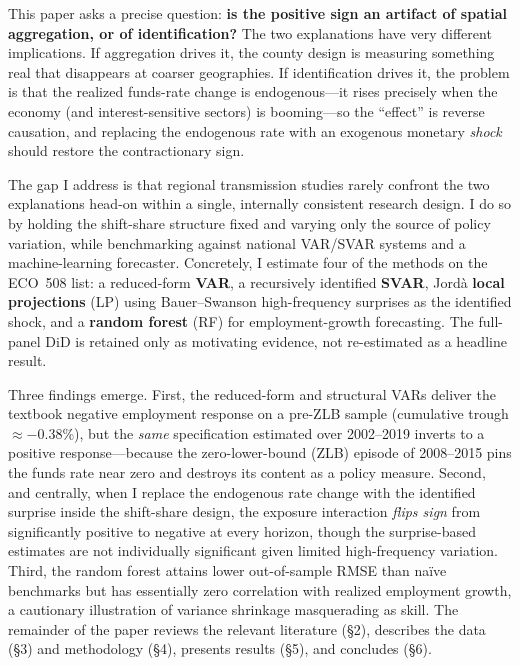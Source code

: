 \documentclass[11pt]{article}
\begin{document}
This paper asks a precise question: \textbf{is the positive sign an artifact of spatial
aggregation, or of identification?} The two explanations have very different implications.
If aggregation drives it, the county design is measuring something real that disappears at
coarser geographies. If identification drives it, the problem is that the realized funds-rate
change is endogenous---it rises precisely when the economy (and interest-sensitive sectors)
is booming---so the ``effect'' is reverse causation, and replacing the endogenous rate with an
exogenous monetary \emph{shock} should restore the contractionary sign.

The gap I address is that regional transmission studies rarely confront the two explanations
head-on within a single, internally consistent research design. I do so by holding the
shift-share structure fixed and varying only the source of policy variation, while
benchmarking against national VAR/SVAR systems and a machine-learning forecaster. Concretely,
I estimate four of the methods on the ECO~508 list: a reduced-form \textbf{VAR}, a recursively
identified \textbf{SVAR}, Jord\`a \textbf{local projections} (LP) using Bauer--Swanson
high-frequency surprises as the identified shock, and a \textbf{random forest} (RF) for
employment-growth forecasting. The full-panel DiD is retained only as motivating evidence, not
re-estimated as a headline result.

Three findings emerge. First, the reduced-form and structural VARs deliver the textbook
negative employment response on a pre-ZLB sample (cumulative trough $\approx -0.38\%$), but the
\emph{same} specification estimated over 2002--2019 inverts to a positive response---because
the zero-lower-bound (ZLB) episode of 2008--2015 pins the funds rate near zero and destroys its
content as a policy measure. Second, and centrally, when I replace the endogenous rate change
with the identified surprise inside the shift-share design, the exposure interaction
\emph{flips sign} from significantly positive to negative at every horizon, though the
surprise-based estimates are not individually significant given limited high-frequency
variation. Third, the random forest attains lower out-of-sample RMSE than na\"ive benchmarks but
has essentially zero correlation with realized employment growth, a cautionary illustration of
variance shrinkage masquerading as skill. The remainder of the paper reviews the relevant
literature (\S2), describes the data (\S3) and methodology (\S4), presents results (\S5), and
concludes (\S6).
\end{document}
